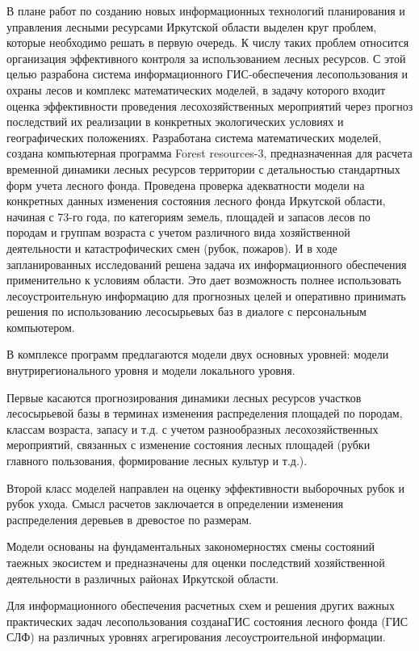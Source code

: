 \documentclass{report}
\begin{document}
В плане работ по созданию новых информационных технологий планирования и  управления  лесными ресурсами Иркутской
области выделен  круг  проблем,  которые  необходимо решать в первую очередь. К числу таких проблем относится
организация эффективного контроля за использованием лесных ресурсов. С этой целью разрабона система информационного
ГИС-обеспечения лесопользования и охраны лесов и комплекс математических моделей, в задачу которого входит оценка
эффективности проведения лесохозяйственных мероприятий через прогноз последствий их реализации в конкретных
экологических условиях и географических положениях. Разработана система математических моделей, создана компьютерная
программа Forest resources{}-3, предназначенная для расчета временной динамики лесных ресурсов территории с
детальностью стандартных форм учета лесного фонда. Проведена проверка адекватности модели на конкретных данных
изменения состояния лесного фонда Иркутской области, начиная с 73-го года, по категориям земель, площадей и запасов
лесов по породам и группам возраста с учетом различного вида хозяйственной деятельности и катастрофических смен (рубок,
пожаров). И в ходе запланированных исследований решена задача их информационного обеспечения применительно к условиям
области.  Это дает возможность полнее использовать лесоустроительную информацию для прогнозных целей и оперативно
принимать решения по использованию лесосырьевых баз в диалоге с персональным компьютером.

В комплексе программ предлагаются модели двух основных уровней: модели внутрирегионального уровня и модели локального
уровня.

Первые  касаются  прогнозирования  динамики  лесных  ресурсов участков лесосырьевой базы в терминах изменения
распределения площадей по породам, классам возраста, запасу и т.д. с учетом разнообразных лесохозяйственных
мероприятий, связанных с изменение состояния лесных площадей (рубки главного пользования, формирование лесных культур и
т.д.).

Второй класс моделей направлен на оценку эффективности выборочных рубок и рубок ухода. Смысл расчетов заключается в
определении изменения распределения деревьев  в  древостое по размерам. 

Модели основаны на фундаментальных закономерностях смены состояний таежных экосистем и предназначены для оценки
последствий хозяйственной деятельности в различных районах Иркутской области.

Для информационного обеспечения расчетных схем и решения других важных практических задач лесопользования созданаГИС
состояния  лесного фонда (ГИС СЛФ) на различных уровнях агрегирования лесоустроительной информации. 
\end{document}
